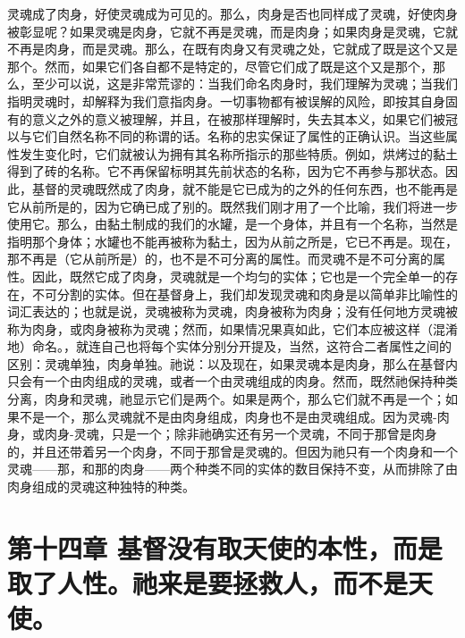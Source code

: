 灵魂成了肉身，好使灵魂成为可见的。那么，肉身是否也同样成了灵魂，好使肉身被彰显呢？如果灵魂是肉身，它就不再是灵魂，而是肉身；如果肉身是灵魂，它就不再是肉身，而是灵魂。那么，在既有肉身又有灵魂之处，它就成了既是这个又是那个。然而，如果它们各自都不是特定的，尽管它们成了既是这个又是那个，那么，至少可以说，这是非常荒谬的：当我们命名肉身时，我们理解为灵魂；当我们指明灵魂时，却解释为我们意指肉身。一切事物都有被误解的风险，即按其自身固有的意义之外的意义被理解，并且，在被那样理解时，失去其本义，如果它们被冠以与它们自然名称不同的称谓的话。名称的忠实保证了属性的正确认识。当这些属性发生变化时，它们就被认为拥有其名称所指示的那些特质。例如，烘烤过的黏土得到了砖的名称。它不再保留标明其先前状态的名称，因为它不再参与那状态。因此，基督的灵魂既然成了肉身，就不能是它已成为的之外的任何东西，也不能再是它从前所是的，因为它确已成了别的。既然我们刚才用了一个比喻，我们将进一步使用它。那么，由黏土制成的我们的水罐，是一个身体，并且有一个名称，当然是指明那个身体；水罐也不能再被称为黏土，因为从前之所是，它已不再是。现在，那不再是（它从前所是）的，也不是不可分离的属性。而灵魂不是不可分离的属性。因此，既然它成了肉身，灵魂就是一个均匀的实体；它也是一个完全单一的存在，不可分割的实体。但在基督身上，我们却发现灵魂和肉身是以简单非比喻性的词汇表达的；也就是说，灵魂被称为灵魂，肉身被称为肉身；没有任何地方灵魂被称为肉身，或肉身被称为灵魂；然而，如果情况果真如此，它们本应被这样（混淆地）命名。，就连自己也将每个实体分别分开提及，当然，这符合二者属性之间的区别：灵魂单独，肉身单独。祂说：以及现在，如果灵魂本是肉身，那么在基督内只会有一个由肉组成的灵魂，或者一个由灵魂组成的肉身。然而，既然祂保持种类分离，肉身和灵魂，祂显示它们是两个。如果是两个，那么它们就不再是一个；如果不是一个，那么灵魂就不是由肉身组成，肉身也不是由灵魂组成。因为灵魂-肉身，或肉身-灵魂，只是一个；除非祂确实还有另一个灵魂，不同于那曾是肉身的，并且还带着另一个肉身，不同于那曾是灵魂的。但因为祂只有一个肉身和一个灵魂——那，和那的肉身——两个种类不同的实体的数目保持不变，从而排除了由肉身组成的灵魂这种独特的种类。\par


\section{第十四章 基督没有取天使的本性，而是取了人性。祂来是要拯救人，而不是天使。}

